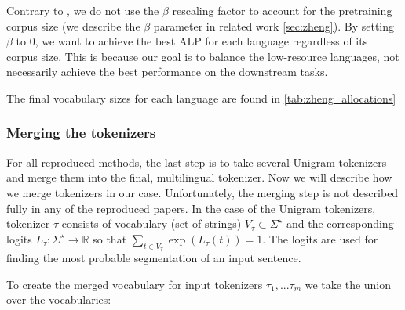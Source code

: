 Contrary to \citet{zheng_allocating_2021}, we do not use the $\beta$ rescaling factor to account for the pretraining corpus size (we describe the $\beta$ parameter in related work \autoref{sec:zheng}). By setting $\beta$ to 0, we want to achieve the best ALP for each language regardless of its corpus size. This is because our goal is to balance the low-resource languages, not necessarily achieve the best performance on the downstream tasks.

The final vocabulary sizes for each language are found in \autoref{tab:zheng_allocations}


\subsubsection{Merging the tokenizers}
\label{subsec:merging_tokenizers}


For all reproduced methods, the last step is to take several Unigram tokenizers and merge them into the final, multilingual tokenizer. Now we will describe how we merge tokenizers in our case. Unfortunately, the merging step is not described fully in any of the reproduced papers. In the case of the Unigram tokenizers, tokenizer $\tau$ consists of vocabulary (set of strings) $V_\tau \subset \Sigma^\star$ and the corresponding logits $L_\tau: \Sigma^\star \rightarrow \mathbb{R}$ so that $\sum_{t \in V_\tau} \exp(L_\tau(t)) = 1$. The logits are used for finding the most probable segmentation of an input sentence. 

To create the merged vocabulary for input tokenizers $\tau_1, ... \tau_m$ we take the union over the vocabularies:

